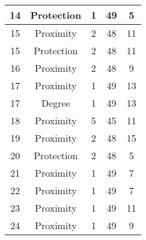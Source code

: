 \documentclass[results.tex]{subfiles}
\begin{document}
\begin{center}
\begin{tabular}{| c || c | c | c | c |}
            \hline
            14                      & Protection                   & 1                      & 49                      & 5                    \\
            \hline
            15                      & Proximity                    & 2                      & 48                      & 11                   \\
            \hline
            15                      & Protection                   & 2                      & 48                      & 11                   \\
            \hline
            16                      & Proximity                    & 2                      & 48                      & 9                    \\
            \hline
            17                      & Proximity                    & 1                      & 49                      & 13                   \\
            \hline
            17                      & Degree                       & 1                      & 49                      & 13                   \\
            \hline
            18                      & Proximity                    & 5                      & 45                      & 11                   \\
            \hline
            19                      & Proximity                    & 2                      & 48                      & 15                   \\
            \hline
            20                      & Protection                   & 2                      & 48                      & 5                    \\
            \hline
            21                      & Proximity                    & 1                      & 49                      & 7                    \\
            \hline
            22                      & Proximity                    & 1                      & 49                      & 7                    \\
            \hline
            23                      & Proximity                    & 1                      & 49                      & 11                   \\
            \hline
            24                      & Proximity                    & 1                      & 49                      & 9                    \\

\end{tabular}
\end{center}
\end{document}
